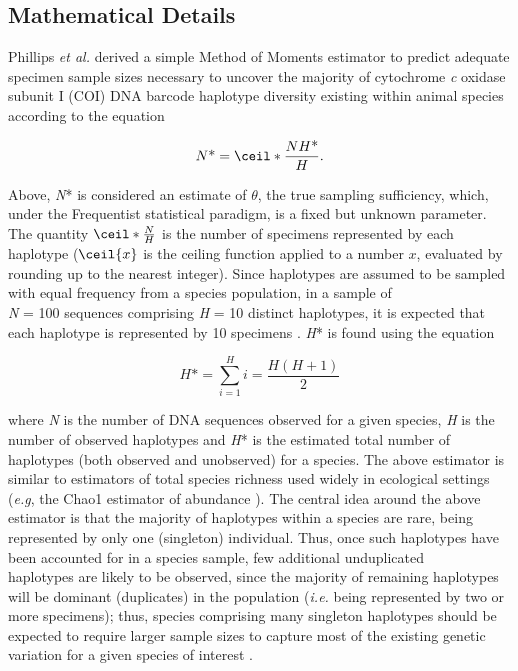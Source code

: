 \subsection{Mathematical Details}

Phillips \textit{et al.} \cite{phillips2015exploration} derived a simple Method of Moments \cite{pearson1894contributions} estimator to predict adequate specimen sample sizes necessary to uncover the majority of cytochrome \textit{c} oxidase subunit I (COI) DNA barcode haplotype diversity existing within animal species according to the equation 

\begin{equation}
N\mbox{*} = \ceil*{\frac{NH\mbox{*}}{H}}.
\label{eqn}
\end{equation}



Above, \textit{N}* is considered an estimate of $\theta$, the true sampling sufficiency, which, under the Frequentist statistical paradigm, is a fixed but unknown parameter. The quantity $\ceil*{\frac{N}{H}}$ is the number of specimens represented by each haplotype ($\ceil{x}$ is the ceiling function applied to a number $x$, evaluated by rounding up to the nearest integer). Since haplotypes are assumed to be sampled with equal frequency from a species population, in a sample of \\ \textit{N} = 100 sequences comprising \textit{H} = 10 distinct haplotypes, it is expected that each haplotype is represented by 10 specimens \cite{phillips2015exploration}. \textit{H}* is found using the equation

\begin{equation}
H\mbox{*}=\sum_{i=1}^H i = \frac{H(H+1)}{2}
\label{eqn}
\end{equation}

\vspace{1mm}

\noindent where \textit{N} is the number of DNA sequences observed for a given species, \textit{H} is the number of observed haplotypes and \textit{H}* is the estimated total number of haplotypes (both observed and unobserved) for a species. The above estimator is similar to estimators of total species richness used widely in ecological settings (\textit{e.g}, the Chao1 estimator of abundance \cite{chao1984nonparametric}). The central idea around the above estimator is that the majority of haplotypes within a species are rare, being represented by only one (singleton) individual. Thus, once such haplotypes have been accounted for in a species sample, few additional unduplicated \\ haplotypes are likely to be observed, since the majority of remaining haplotypes will be dominant (duplicates) in the population (\textit{i.e.} being represented by two or more specimens); thus, species comprising many singleton haplotypes should be expected to require larger sample sizes to capture most of the existing genetic variation for a given species of interest \cite{phillips2015exploration, williams2016early}.


